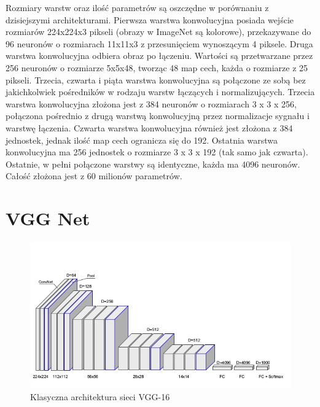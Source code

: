\documentclass[12pt,a4paper,twoside,titlepage,openright]{book}
\begin{document}
\begin{itemize}
Rozmiary warstw oraz ilość parametrów są oszczędne w porównaniu z dzisiejszymi architekturami. Pierwsza warstwa konwolucyjna posiada wejście rozmiarów 224x224x3 pikseli (obrazy w ImageNet są kolorowe), przekazywane do 96 neuronów o rozmiarach 11x11x3 z przesunięciem wynoszącym 4 piksele. Druga warstwa konwolucyjna odbiera obraz po łączeniu. Wartości są przetwarzane przez 256 neuronów o rozmiarze 5x5x48, tworząc 48 map cech, każda o rozmiarze z 25 pikseli. Trzecia, czwarta i piąta warstwa konwolucyjna są połączone ze sobą bez jakichkolwiek pośredników w rodzaju warstw łączących i normalizujących. Trzecia warstwa konwolucyjna złożona jest z 384 neuronów o rozmiarach 3 x 3 x 256, połączona pośrednio z drugą warstwą konwolucyjną przez normalizacje sygnału i warstwę łączenia. Czwarta warstwa konwolucyjna również jest złożona z 384 jednostek, jednak ilość map cech ogranicza się do 192. Ostatnia warstwa konwolucyjna ma 256 jednostek o rozmiarze 3 x 3 x 192 (tak samo jak czwarta). Ostatnie, w pełni połączone warstwy są identyczne, każda ma 4096 neuronów. Całość złożona jest z 60 milionów parametrów. \cite{NIPS2012_4824}

\section{VGG Net}
\begin{figure}[ht]
	\centering
			\includegraphics[resolution=100, scale=0.8]{VGGarchitecture.png}
		\caption{Klasyczna architektura sieci VGG-16}
\end{figure}


\end{itemize}
\end{document}
